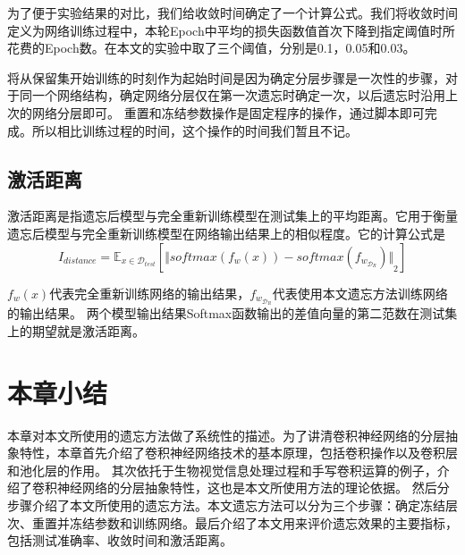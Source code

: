 为了便于实验结果的对比，我们给收敛时间确定了一个计算公式。我们将收敛时间定义为网络训练过程中，本轮Epoch中平均的损失函数值首次下降到指定阈值时所花费的Epoch数。在本文的实验中取了三个阈值，分别是0.1，0.05和0.03。

将从保留集开始训练的时刻作为起始时间是因为确定分层步骤是一次性的步骤，对于同一个网络结构，确定网络分层仅在第一次遗忘时确定一次，以后遗忘时沿用上次的网络分层即可。
重置和冻结参数操作是固定程序的操作，通过脚本即可完成。所以相比训练过程的时间，这个操作的时间我们暂且不记。

\subsection{激活距离}
激活距离是指遗忘后模型与完全重新训练模型在测试集上的平均距离。它用于衡量遗忘后模型与完全重新训练模型在网络输出结果上的相似程度。它的计算公式是
\begin{equation}
I_{distance} = {\mathbb{E}}_{x\in {\mathcal{D}_{test}}}[{\Vert softmax(f_w(x)) - softmax(f_{w_{\mathcal{D}_R}}) \Vert}_2 ] \label{index_distance}
\end{equation}

$f_w(x)$代表完全重新训练网络的输出结果，$f_{w_{\mathcal{D}_R}}$代表使用本文遗忘方法训练网络的输出结果。
两个模型输出结果Softmax函数输出的差值向量的第二范数在测试集上的期望就是激活距离。


\section{本章小结}
本章对本文所使用的遗忘方法做了系统性的描述。为了讲清卷积神经网络的分层抽象特性，本章首先介绍了卷积神经网络技术的基本原理，包括卷积操作以及卷积层和池化层的作用。
其次依托于生物视觉信息处理过程和手写卷积运算的例子，介绍了卷积神经网络的分层抽象特性，这也是本文所使用方法的理论依据。
然后分步骤介绍了本文所使用的遗忘方法。本文遗忘方法可以分为三个步骤：确定冻结层次、重置并冻结参数和训练网络。最后介绍了本文用来评价遗忘效果的主要指标，包括测试准确率、收敛时间和激活距离。
